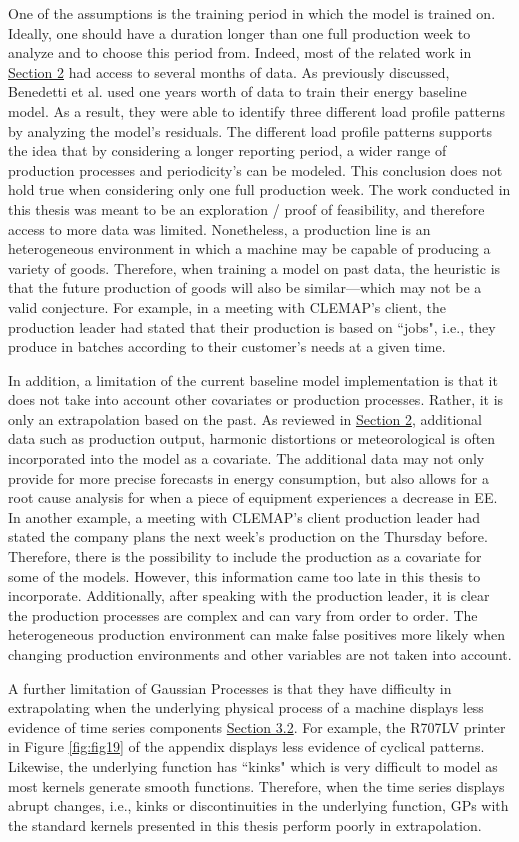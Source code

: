 One of the assumptions is the training period in which the model is trained on. Ideally, one should have a duration longer than one full production week to analyze and to choose this period from. Indeed, most of the related work in \hyperlink{section.2}{Section 2} had access to several months of data. As previously discussed, Benedetti et al. \cite{cas} used one years worth of data to train their energy baseline model. As a result, they were able to identify three different load profile patterns by analyzing the model's residuals. The different load profile patterns supports the idea that by considering a longer reporting period, a wider range of production processes and periodicity's can be modeled. This conclusion does not hold true when considering only one full production week. The work conducted in this thesis was meant to be an exploration / proof of feasibility, and therefore access to more data was limited. Nonetheless, a production line is an heterogeneous environment in which a machine may be capable of producing a variety of goods. Therefore, when training a model on past data, the heuristic is that the future production of goods will also be similar—which may not be a valid conjecture. For example, in a meeting with CLEMAP's client, the production leader had stated that their production is based on ``jobs", i.e., they produce in batches according to their customer's needs at a given time.

In addition, a limitation of the current baseline model implementation is that it does not take into account other covariates or production processes. Rather, it is only an extrapolation based on the past. As reviewed in \hyperlink{section.2}{Section 2}, additional data such as production output, harmonic distortions or meteorological is often incorporated into the model as a covariate. The additional data may not only provide for more precise forecasts in energy consumption, but also allows for a root cause analysis for when a piece of equipment experiences a decrease in EE. In another example, a meeting with CLEMAP's client production leader had stated the company plans the next week's production on the Thursday before. Therefore, there is the possibility to include the production as a covariate for some of the models. However, this information came too late in this thesis to incorporate. Additionally, after speaking with the production leader, it is clear the production processes are complex and can vary from order to order. The heterogeneous production environment can make false positives more likely when changing production environments and other variables are not taken into account.

A further limitation of Gaussian Processes is that they have difficulty in extrapolating when the underlying physical process of a machine displays less evidence of time series components \hyperlink{subsection.3.2}{Section 3.2}. For example, the R707LV printer in Figure \ref{fig:fig19} of the appendix displays less evidence of cyclical patterns. Likewise, the underlying function has ``kinks" which is very difficult to model as most kernels generate smooth functions. Therefore, when the time series displays abrupt changes, i.e., kinks or discontinuities in the underlying function, GPs with the standard kernels presented in this thesis perform poorly in extrapolation. 